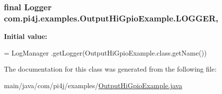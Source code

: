 \subsubsection[{L\+O\+G\+G\+E\+R}]{\setlength{\rightskip}{0pt plus 5cm}final Logger com.\+pi4j.\+examples.\+Output\+Hi\+Gpio\+Example.\+L\+O\+G\+G\+E\+R\hspace{0.3cm}{\ttfamily [static]}, {\ttfamily [private]}}\label{classcom_1_1pi4j_1_1examples_1_1OutputHiGpioExample_a6a7e1b255c583e81ad61ab6508479009}
{\bfseries Initial value\+:}
\begin{DoxyCode}
= LogManager
            .getLogger(OutputHiGpioExample.class.getName())
\end{DoxyCode}


The documentation for this class was generated from the following file\+:\begin{DoxyCompactItemize}
\item 
main/java/com/pi4j/examples/\hyperlink{OutputHiGpioExample_8java}{Output\+Hi\+Gpio\+Example.\+java}\end{DoxyCompactItemize}
